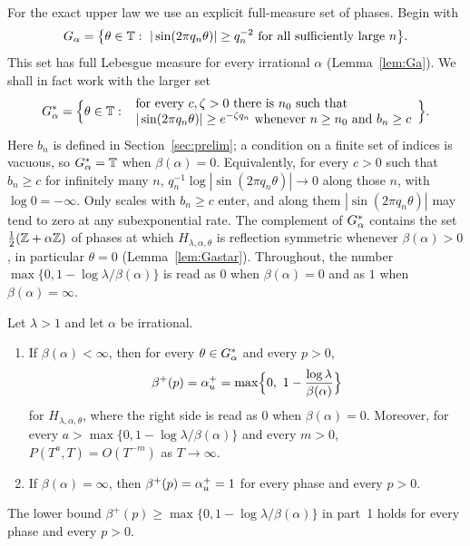 For the exact upper law we use an explicit full-measure set of phases. Begin with
\begin{equation}\label{eq:Ga}
G_\alpha=\bigl\{\theta\in\mathbb T:\ |\sin(2\pi q_n\theta)|\ge q_n^{-2}\ \text{for all sufficiently large }n\bigr\}.
\end{equation}
This set has full Lebesgue measure for every irrational $\alpha$ (Lemma~\ref{lem:Ga}). We shall in fact work with the larger set
\begin{equation}\label{eq:Gastar}
G_\alpha^*=\Bigl\{\theta\in\mathbb T:\ \begin{array}{l}
\text{for every }c,\zeta>0\text{ there is }n_0\text{ such that}\\
|\sin(2\pi q_n\theta)|\ge e^{-\zeta q_n}
\text{ whenever }n\ge n_0\text{ and }b_n\ge c
\end{array}\Bigr\}.
\end{equation}
Here $b_n$ is defined in Section~\ref{sec:prelim}; a condition on a finite set of indices is vacuous, so $G_\alpha^*=\mathbb T$ when $\beta(\alpha)=0$. Equivalently, for every $c>0$ such that $b_n\ge c$ for infinitely many $n$, $q_n^{-1}\log|\sin(2\pi q_n\theta)|\to0$ along those $n$, with $\log0=-\infty$. Only scales with $b_n\ge c$ enter, and along them $|\sin(2\pi q_n\theta)|$ may tend to zero at any subexponential rate. The complement of $G_\alpha^*$ contains the set $\frac12(\mathbb Z+\alpha\mathbb Z)$ of phases at which $H_{\lambda,\alpha,\theta}$ is reflection symmetric whenever $\beta(\alpha)>0$, in particular $\theta=0$ (Lemma~\ref{lem:Gastar}). Throughout, the number $\max\{0,1-\log\lambda/\beta(\alpha)\}$ is read as $0$ when $\beta(\alpha)=0$ and as $1$ when $\beta(\alpha)=\infty$.

\begin{maintheorem}\label{thm:A}
Let $\lambda>1$ and let $\alpha$ be irrational.
\begin{enumerate}
\item If $\beta(\alpha)<\infty$, then for every $\theta\in G_\alpha^*$ and every $p>0$,
\[
\beta^+(p)=\au=\max\Bigl\{0,\ 1-\frac{\log\lambda}{\beta(\alpha)}\Bigr\}
\]
for $H_{\lambda,\alpha,\theta}$, where the right side is read as $0$ when $\beta(\alpha)=0$.
Moreover, for every $a>\max\{0,1-\log\lambda/\beta(\alpha)\}$ and every $m>0$, $P(T^a,T)=O(T^{-m})$ as $T\to\infty$.
\item If $\beta(\alpha)=\infty$, then $\beta^+(p)=\alpha_u^+=1$ for every phase and every $p>0$.
\end{enumerate}
The lower bound $\beta^+(p)\ge\max\{0,1-\log\lambda/\beta(\alpha)\}$ in part~1 holds for every phase and every $p>0$.
\end{maintheorem}

